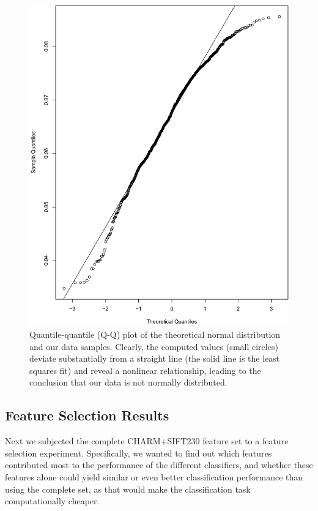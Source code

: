 \begin{figure}
	\centering
	\includegraphics[width=\columnwidth]{fig09}
	\caption{Quantile-quantile (Q-Q) plot of the theoretical normal distribution and our data samples. Clearly, the computed values (small circles) deviate substantially from a straight line (the solid line is the least squares fit) and reveal a nonlinear relationship, leading to the conclusion that our data is not normally distributed.}
	\label{fig:normalityPlot}
\end{figure}

\subsection{Feature Selection Results}
\label{subsec:featureSelectionResults}

Next we subjected the complete CHARM+SIFT230 feature set to a feature selection experiment. Specifically, we wanted to find out which features contributed most to the performance of the different classifiers, and whether these features alone could yield similar or even better classification performance than using the complete set, as that would make the classification task computationally cheaper.

